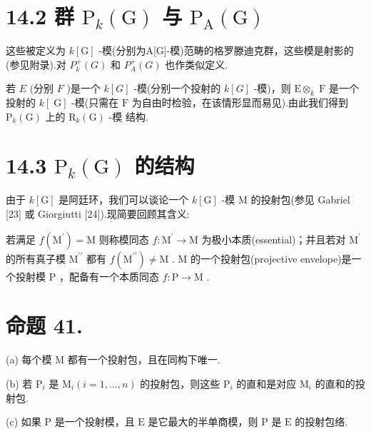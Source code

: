 \documentclass[10pt]{article}
\begin{document}
\section*{14.2 群 \({\mathrm{P}}_{k}\left( \mathrm{G}\right)\) 与 \({\mathrm{P}}_{\mathrm{A}}\left( \mathrm{G}\right)\)}

这些被定义为 \(k\left\lbrack  \mathrm{G}\right\rbrack\) -模(分别为A[G]-模)范畴的格罗滕迪克群，这些模是射影的(参见附录).对 \({P}_{k}^{ + }\left( G\right)\) 和 \({P}_{A}^{ + }\left( G\right)\) 也作类似定义.

若 \(E\) (分别 \(F\) )是一个 \(k\left\lbrack  G\right\rbrack\) -模(分别一个投射的 \(k\left\lbrack  G\right\rbrack\) -模)，则 \(\mathrm{E}{ \otimes  }_{k}\mathrm{\;F}\) 是一个投射的 \(k\left\lbrack  \mathrm{\;G}\right\rbrack\) -模(只需在 \(\mathrm{F}\) 为自由时检验，在该情形显而易见).由此我们得到 \({\mathrm{P}}_{k}\left( \mathrm{G}\right)\) 上的 \({\mathrm{R}}_{k}\left( \mathrm{G}\right)\) -模 结构.

\section*{14.3 \({\mathrm{P}}_{k}\left( \mathrm{G}\right)\) 的结构}

由于 \(k\left\lbrack  \mathrm{G}\right\rbrack\) 是阿廷环，我们可以谈论一个 \(k\left\lbrack  \mathrm{G}\right\rbrack\) -模 M 的投射包(参见 Gabriel [23] 或 Giorgiutti [24]).现简要回顾其含义:

若满足 \(f\left( {\mathrm{M}}^{\prime }\right)  = \mathrm{M}\) 则称模同态 \(f : {\mathrm{M}}^{\prime } \rightarrow  \mathrm{M}\) 为极小本质(essential)；并且若对 \({\mathrm{M}}^{\prime }\) 的所有真子模 \({\mathrm{M}}^{\prime \prime }\) 都有 \(f\left( {\mathrm{M}}^{\prime \prime }\right)  \neq  \mathrm{M}\) . \(\mathrm{M}\) 的一个投射包(projective envelope)是一个投射模 \(\mathrm{P}\) ，配备有一个本质同态 \(f : \mathrm{P} \rightarrow  \mathrm{M}\) .

\section*{命题 41.}

(a) 每个模 \(\mathrm{M}\) 都有一个投射包，且在同构下唯一.

(b) 若 \({\mathrm{P}}_{i}\) 是 \({\mathrm{M}}_{i}\left( {i = 1,\ldots ,n}\right)\) 的投射包，则这些 \({\mathrm{P}}_{i}\) 的直和是对应 \({\mathrm{M}}_{i}\) 的直和的投射包.

(c) 如果 \(\mathrm{P}\) 是一个投射模，且 \(\mathrm{E}\) 是它最大的半单商模，则 \(\mathrm{P}\) 是 \(\mathrm{E}\) 的投射包络.
\end{document}
